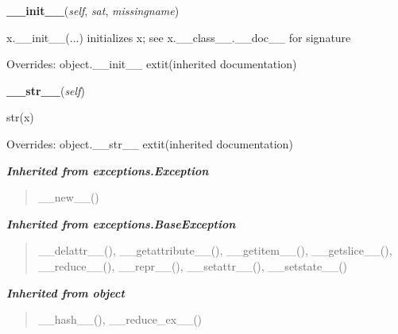     \vspace{0.5ex}

\hspace{.8\funcindent}\begin{boxedminipage}{\funcwidth}

    \raggedright \textbf{\_\_init\_\_}(\textit{self}, \textit{sat}, \textit{missingname})

\setlength{\parskip}{2ex}
    x.\_\_init\_\_(...) initializes x; see x.\_\_class\_\_.\_\_doc\_\_ for 
    signature

\setlength{\parskip}{1ex}
      Overrides: object.\_\_init\_\_ 	extit{(inherited documentation)}

    \end{boxedminipage}

    \vspace{0.5ex}

\hspace{.8\funcindent}\begin{boxedminipage}{\funcwidth}

    \raggedright \textbf{\_\_str\_\_}(\textit{self})

\setlength{\parskip}{2ex}
    str(x)

\setlength{\parskip}{1ex}
      Overrides: object.\_\_str\_\_ 	extit{(inherited documentation)}

    \end{boxedminipage}


\large{\textbf{\textit{Inherited from exceptions.Exception}}}

\begin{quote}
\_\_new\_\_()
\end{quote}

\large{\textbf{\textit{Inherited from exceptions.BaseException}}}

\begin{quote}
\_\_delattr\_\_(), \_\_getattribute\_\_(), \_\_getitem\_\_(), \_\_getslice\_\_(), \_\_reduce\_\_(), \_\_repr\_\_(), \_\_setattr\_\_(), \_\_setstate\_\_()
\end{quote}

\large{\textbf{\textit{Inherited from object}}}

\begin{quote}
\_\_hash\_\_(), \_\_reduce\_ex\_\_()
\end{quote}


